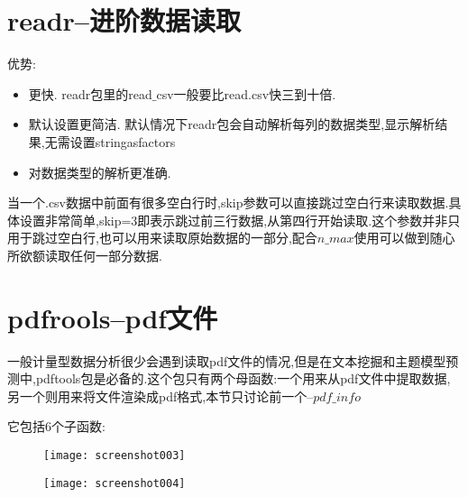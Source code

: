 \documentclass[11pt,a4paper,oneside]{book}
\begin{document}
\section{readr--进阶数据读取}
优势:
\begin{itemize}
	\item 更快. readr包里的read$ \_ $csv一般要比read.csv快三到十倍.
	\item 默认设置更简洁. 默认情况下readr包会自动解析每列的数据类型,显示解析结果,无需设置stringasfactors
	\item 对数据类型的解析更准确.
\end{itemize}

当一个.csv数据中前面有很多空白行时,skip参数可以直接跳过空白行来读取数据.具体设置非常简单,skip=3即表示跳过前三行数据,从第四行开始读取.这个参数并非只用于跳过空白行,也可以用来读取原始数据的一部分,配合$ n\_max $使用可以做到随心所欲额读取任何一部分数据.

\section{pdfrools--pdf文件}
一般计量型数据分析很少会遇到读取pdf文件的情况,但是在文本挖掘和主题模型预测中,pdftools包是必备的.这个包只有两个母函数:一个用来从pdf文件中提取数据,另一个则用来将文件渲染成pdf格式,本节只讨论前一个--$ pdf\_info $

它包括6个子函数:
\begin{figure}[H]
	\centering
	\texttt{[image: screenshot003]}
\end{figure}
\begin{figure}[H]
	\centering
	\texttt{[image: screenshot004]}
\end{figure}
\end{document}
